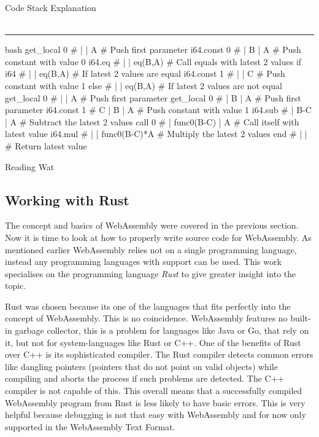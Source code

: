 \begin{listing}
\hspace{1cm} Code \hspace{3cm} Stack \hspace{4cm} Explanation \vspace{-0.5cm} \\\\
\noindent\rule{\textwidth}{0.6pt} \vspace{-0.5cm}
\begin{code}[]{bash}
get_local 0      #   |            | A            # Push first parameter         
i64.const 0      #   | B          | A            # Push constant with value 0
i64.eq           #   |            | eq(B,A)      # Call equals with latest 2 values
if i64           #   |            | eq(B,A)      # If latest 2 values are equal
    i64.const 1  #   |            | C            # Push constant with value 1
else             #   |            | eq(B,A)      # If latest 2 values are not equal
    get_local 0  #   |            | A            # Push first parameter
    get_local 0  #   | B          | A            # Push first parameter
    i64.const 1  # C | B          | A            # Push constant with value 1
    i64.sub      #   | B-C        | A            # Subtract the latest 2 values
    call 0       #   | func0(B-C) | A            # Call itself with latest value
    i64.mul      #   |            | func0(B-C)*A # Multiply the latest 2 values
end              #   |            |              # Return latest value
\end{code}
\caption{Reading Wat}
\label{lst:wat-code}
\end{listing}

\label{sec:rust}
\subsection{Working with Rust}
The concept and basics of WebAssembly were covered in the previous section. Now it is time to look at how to properly write source code for WebAssembly. As mentioned earlier WebAssembly relies not on a single programming language, instead any programming languages with support can be used.
This work specialises on the programming language \textit{Rust} to give greater insight into the topic. 

Rust was chosen because its one of the languages that fits perfectly into the concept of WebAssembly. This is no coincidence. WebAssembly features no built-in garbage collector, this is a problem for languages like Java or Go, that rely on it, but not for system-languages like Rust or C++. One of the benefits of Rust over C++ is its sophisticated compiler. The Rust compiler detects common errors like dangling \glspl{pointer} (pointers that do not point on valid objects) while compiling and aborts the process if such problems are detected. The C++ compiler is not capable of this. This overall means that a successfully compiled WebAssembly program from Rust is less likely to have basic errors. This is very helpful because debugging is not that easy with WebAssembly and for now only supported in the WebAssembly Text Format.

